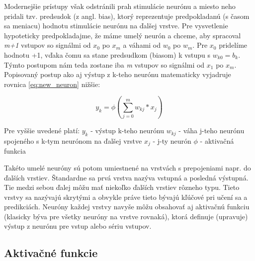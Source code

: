 Modernejšie prístupy však odstránili prah stimulácie neurónu a miesto neho pridali tzv. predsudok (z angl. bias), ktorý reprezentuje predpokladanú (s časom sa meniacu) hodnotu stimulácie neurónu na ďalšej vrstve. Pre vysvetlenie hypoteticky predpokladajme, že máme umelý neurón a chceme, aby spracoval \textit{m+1} vstupov so signálmi od \(x_0\) po \(x_m\) a váhami od \(w_0\) po \(w_m\). Pre \(x_0\) pridelíme hodnotu +1, vďaka čomu sa stane predsudkom (biasom) k vstupu s \(w_{k0} = b_k\). Týmto postupom nám teda zostane iba \textit{m} vstupov so signálmi od \(x_1\) po \(x_m\). Popisovaný postup ako aj výstup z k-teho neurónu matematicky vyjadruje rovnica \ref{eq:new_neuron} nižšie:

	\begin{equation}
		\label{eq:new_neuron}
		y_k = \phi (\sum_{j=0}^{m} w_{kj}*x_j)
	\end{equation}
	
Pre vyššie uvedené platí:
\newline
\(y_k\) - výstup k-teho neurónu
\newline
\(w_{kj}\) - váha j-teho neurónu spojeného s k-tym neurónom na ďalšej vrstve
\newline
\(x_j\) - j-ty neurón 
\newline
\(\phi\) - aktivačná funkcia
\newline

Takéto umelé neuróny sú potom umiestnené na vrstvách s prepojeniami napr. do ďalších vrstiev. Štandardne sa prvá vrstva nazýva vstupná a posledná výstupná. Tie medzi sebou ďalej môžu mať niekoľko ďalších vrstiev rôzneho typu. Tieto vrstvy sa nazývajú skrytými a obvykle práve tieto bývajú kľúčové pri učení sa a predikciách. Neuróny každej vrstvy navyše môžu obsahovať aj aktivačnú funkciu (klasicky býva pre všetky neuróny na vrstve rovnaká), ktorá definuje (upravuje) výstup z neurónu pre vstup alebo sériu vstupov.
	
\subsection{Aktivačné funkcie}\label{activation_functions}

